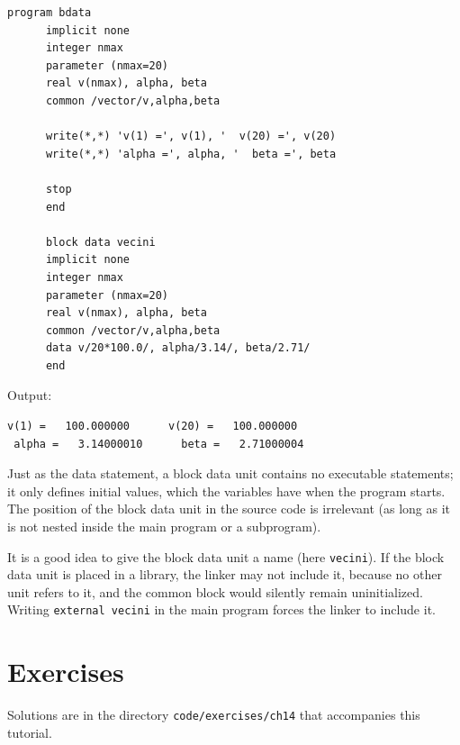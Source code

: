 \begin{lstlisting}[style=fortran77]
      program bdata
      implicit none
      integer nmax
      parameter (nmax=20)
      real v(nmax), alpha, beta
      common /vector/v,alpha,beta

      write(*,*) 'v(1) =', v(1), '  v(20) =', v(20)
      write(*,*) 'alpha =', alpha, '  beta =', beta

      stop
      end

      block data vecini
      implicit none
      integer nmax
      parameter (nmax=20)
      real v(nmax), alpha, beta
      common /vector/v,alpha,beta
      data v/20*100.0/, alpha/3.14/, beta/2.71/
      end
\end{lstlisting}

Output:

\begin{lstlisting}[style=output]
 v(1) =   100.000000      v(20) =   100.000000
 alpha =   3.14000010      beta =   2.71000004
\end{lstlisting}

Just as the data statement, a block data unit contains no executable statements; it only defines initial values, which the variables have when the program starts. The position of the block data unit in the source code is irrelevant (as long as it is not nested inside the main program or a subprogram).

It is a good idea to give the block data unit a name (here \texttt{vecini}). If the block data unit is placed in a library, the linker may not include it, because no other unit refers to it, and the common block would silently remain uninitialized. Writing \texttt{external vecini} in the main program forces the linker to include it.

\section{Exercises}

Solutions are in the directory \texttt{code/exercises/ch14} that accompanies this tutorial.


